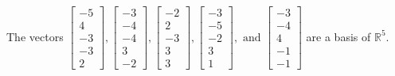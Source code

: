 \begin{exercise}
\begin{exerciseStatement}
  \end{exerciseStatement}
  \begin{exerciseAnswer}
   The vectors \(\left[\begin{array}{r}
-5 \\
4 \\
-3 \\
-3 \\
2
\end{array}\right] , \left[\begin{array}{r}
-3 \\
-4 \\
-4 \\
3 \\
-2
\end{array}\right] , \left[\begin{array}{r}
-2 \\
2 \\
-3 \\
3 \\
3
\end{array}\right] , \left[\begin{array}{r}
-3 \\
-5 \\
-2 \\
3 \\
1
\end{array}\right] , \text{ and } \left[\begin{array}{r}
-3 \\
-4 \\
4 \\
-1 \\
-1
\end{array}\right]\) 
  	 are  a basis of \(\mathbb{R}^5\).
  


  \end{exerciseAnswer}
\end{exercise}